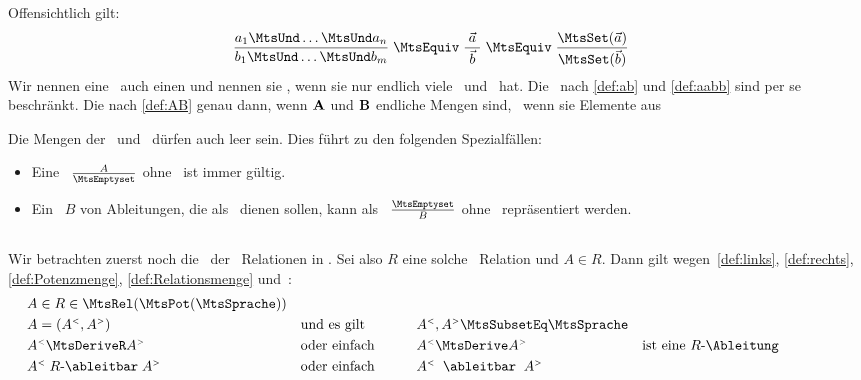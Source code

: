 Offensichtlich gilt:
\begin{align}
	& \frac{a_1 \MtsUnd \dots \MtsUnd a_n}{b_1 \MtsUnd \dots \MtsUnd b_m} \; \MtsEquiv \; \frac{\; \vec{a} \;}{\; \vec{b} \;} \; \MtsEquiv \; \frac{\MtsSet(\vec{a})}{\MtsSet(\vec{b})} \label{eq:AB}
\end{align}
Wir nennen eine \Schlussregel\ auch einen  und nennen sie , wenn sie nur endlich viele \Praemissen\ und \Konklusionen\ hat.
Die \Schlussregeln\ nach \eqref{def:ab} und \eqref{def:aabb} sind per se beschränkt.
Die nach \eqref{def:AB} genau dann, wenn $\mathbf{A}$ und $\mathbf{B}$ endliche Mengen sind, \textdh\ wenn sie Elemente aus%

Die Mengen der \Praemissen\ und \Konklusionen\ dürfen auch leer sein.
Dies führt zu den folgenden Spezialfällen:
\begin{itemize}
	\item[] Eine \Schlussregel\ $\frac{A}{\MtsEmptyset}$ ohne \Konklusionen\ ist immer gültig.
	\item[] Ein \Menge\ $B$ von Ableitungen, die als \Axiome\ dienen sollen, kann als \Schlussregel\ $\frac{\MtsEmptyset}{B}$ ohne \Praemissen\ repräsentiert werden.
\end{itemize}

\subsection[Schlussregeln]{\Schlussregeln}%
\label {sub:Schlussregeln}

Wir betrachten zuerst noch die \Menge\ der \binaeren\ Relationen in \MtsPotSprache.
Sei also $R$ eine solche \binaere\ Relation und $A \in R$.
Dann gilt wegen~\eqref{def:links}, \eqref{def:rechts}, \eqref{def:Potenzmenge}, \eqref{def:Relationsmenge} und~:
\begin{align}
	&  A \in R \in \MtsRelAllDerive   \\
	&  A = (\links{A},\rechts{A})
	&& \text{und es gilt}
	&& \links{A}, \rechts{A} \MtsSubsetEq \MtsSprache \\
	&  \links{A} \MtsDeriveR \rechts{A}
	&& \text{oder einfach}
	&& \links{A} \MtsDerive  \rechts{A}
	&& \text{ist eine $R$-\Ableitung}                  \\
	&  \links{A} \; \text{$R$-\ableitbar} \; \rechts{A}
	&& \text{oder einfach} \qquad
	&& \links{A} \;\; \text{\ableitbar} \;\; \rechts{A}
	\formulatoleft
\end{align}

